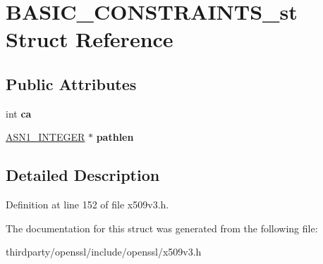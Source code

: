 \hypertarget{struct_b_a_s_i_c___c_o_n_s_t_r_a_i_n_t_s__st}{}\section{B\+A\+S\+I\+C\+\_\+\+C\+O\+N\+S\+T\+R\+A\+I\+N\+T\+S\+\_\+st Struct Reference}
\label{struct_b_a_s_i_c___c_o_n_s_t_r_a_i_n_t_s__st}
\subsection*{Public Attributes}
\begin{DoxyCompactItemize}
\item 
\mbox{\label{struct_b_a_s_i_c___c_o_n_s_t_r_a_i_n_t_s__st_ab8ac4eeb5ae30bd87b9ffdef9e35c218}} 
int {\bfseries ca}
\item 
\mbox{\label{struct_b_a_s_i_c___c_o_n_s_t_r_a_i_n_t_s__st_ab0a6cfe28df8cd5f8bc4f24a3277c7b4}} 
\hyperlink{structasn1__string__st}{A\+S\+N1\+\_\+\+I\+N\+T\+E\+G\+ER} $\ast$ {\bfseries pathlen}
\end{DoxyCompactItemize}


\subsection{Detailed Description}


Definition at line 152 of file x509v3.\+h.



The documentation for this struct was generated from the following file\+:\begin{DoxyCompactItemize}
\item 
thirdparty/openssl/include/openssl/x509v3.\+h\end{DoxyCompactItemize}
